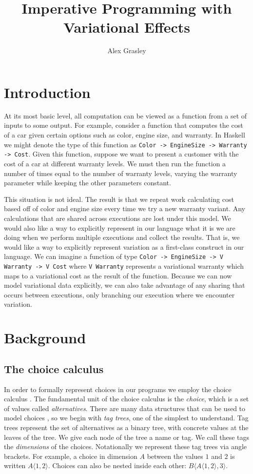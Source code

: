 \documentclass[letterpaper,10pt,onecolumn]{article}
\title{Imperative Programming with Variational Effects}
\author{Alex Grasley}
\newcommand{\tagtree}[3]{#1 \langle #2, #3 \rangle}
\begin{document}
\maketitle

\section{Introduction}

At its most basic level, all computation can be viewed as a function from a set of inputs to some
output. For example, consider a function that computes the cost of a car given certain options such
as color, engine size, and warranty. In Haskell we might denote the type of this function as
\texttt{Color -> EngineSize -> Warranty -> Cost}. Given this function, suppose we want to present
a customer with the cost of a car at different warranty levels. We must then run the function a number of
times equal to the number of warranty levels, varying the warranty parameter while keeping the other
parameters constant.

This situation is not ideal. The result is that we repeat work calculating cost based off of color and engine
size every time we try a new warranty variant. Any calculations that are shared across executions are
lost under this model. We would also like a way to explicitly represent in our language what it is 
we are doing when we perform multiple executions and collect the results. That is, we would like a way
to explicitly represent variation as a first-class construct in our language. We can imagine a function
of type \texttt{Color -> EngineSize -> V Warranty -> V Cost} where \texttt{V Warranty} represents a
variational warranty which maps to a variational cost as the result of the function. Because we can
now model variational data explicitly, we can also take advantage of any sharing that occurs between
executions, only branching our execution where we encounter variation.

\section{Background}

\subsection{The choice calculus}

In order to formally represent choices in our programs we employ the choice
calculus \cite{ericthesis,erwig2011choice}. The fundamental unit of the choice calculus is
the \emph{choice}, which is a set of values called \emph{alternatives}.
There are many data structures that can be used to model
choices \cite{walkingshaw2014variational}, so we begin with \emph{tag trees}, one of
the simplest to understand. Tag trees represent the set of alternatives as a binary tree, with concrete
values at the leaves of the tree. We give each node of the tree a name or tag. We call these
tags the \emph{dimensions} of the choices. Notationally we represent these tag trees
via angle brackets. For example, a choice in dimension $A$
between the values $1$ and $2$ is written $\tagtree{A}{1}{2}$. Choices can also be nested inside
each other: $\tagtree{B}{\tagtree{A}{1}{2}}{3}$.
\end{document}

